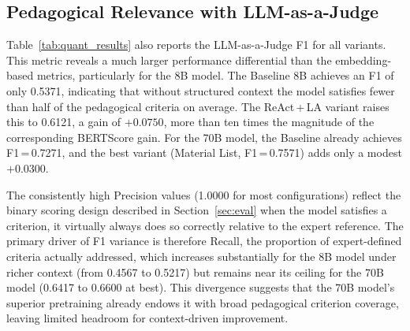 \documentclass[conference,a4paper]{IEEEtran}
\begin{document}
\subsection{Pedagogical Relevance with LLM-as-a-Judge}

Table~\ref{tab:quant_results} also reports the
LLM-as-a-Judge F1 for all variants. This metric
reveals a much larger performance differential than
the embedding-based metrics, particularly for the
8B model. The Baseline 8B achieves an F1 of only
0.5371, indicating that without structured context
the model satisfies fewer than half of the
pedagogical criteria on average. The ReAct\,+\,LA
variant raises this to 0.6121, a gain of
$+0.0750$, more than ten times the magnitude of
the corresponding BERTScore gain. For the 70B
model, the Baseline already achieves
F1\,=\,0.7271, and the best variant (Material
List, F1\,=\,0.7571) adds only a modest
$+0.0300$.


The consistently high Precision values (1.0000 
for most configurations) reflect the binary 
scoring design described in 
Section~\ref{sec:eval} when the model satisfies 
a criterion, it virtually always does so 
correctly relative to the expert reference. 
The primary driver of F1 variance is therefore 
Recall, the proportion of expert-defined
criteria actually addressed, which increases 
substantially for the 8B model under richer 
context (from 0.4567 to 0.5217) but remains 
near its ceiling for the 70B model (0.6417 to 
0.6600 at best). This divergence suggests that 
the 70B model's superior pretraining already 
endows it with broad pedagogical criterion 
coverage, leaving limited headroom for 
context-driven improvement.
\end{document}
